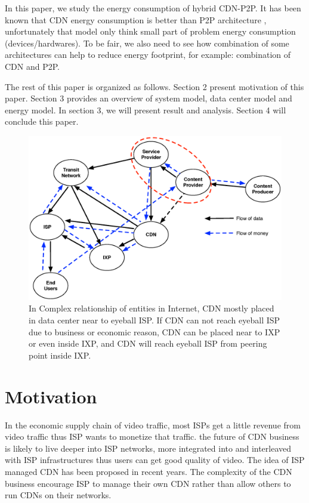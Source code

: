 \documentclass[JIP]{ipsj}
\begin{document}
In this paper, we study the energy consumption of hybrid CDN-P2P.  
It has been known that CDN energy consumption is better than P2P architecture \cite{feldmann2010energy,baliga2007energy}, unfortunately that model only think small part of problem energy consumption (devices/hardwares).
To be fair, we also need to see how combination of some architectures can help to reduce energy footprint, for example: combination of CDN and P2P.

The rest of this paper is organized as follows. 
Section 2 present motivation of this paper.
Section 3 provides an overview of system model, data center model and energy model.  
In section 3, we will present result and analysis.  
Section 4 will conclude this paper. 

\begin{figure}[tb]
\begin{center}
\includegraphics[scale=0.4]{graphs/business-relationship.eps}
\end{center}
\caption{In Complex relationship of entities in Internet, 
CDN mostly placed in data center near to eyeball ISP. 
If CDN can not reach eyeball ISP due to business or economic reason, CDN can be placed near to IXP or even inside IXP, and CDN will reach eyeball ISP from peering point inside IXP.}
\label{fig:businessrelationship}
\end{figure} 

\section{Motivation}\label{motivation}
In the economic supply chain of video traffic, most ISPs get a little revenue from video traffic thus ISP wants to monetize that traffic.
the future of CDN business is likely to live deeper into ISP networks, more integrated into and interleaved with ISP infrastructures thus users can get good quality of video.
The idea of ISP managed CDN has been proposed in recent years.
The complexity of the CDN business encourage ISP to manage their own CDN rather than allow others to run CDNs on their networks.
\end{document}
